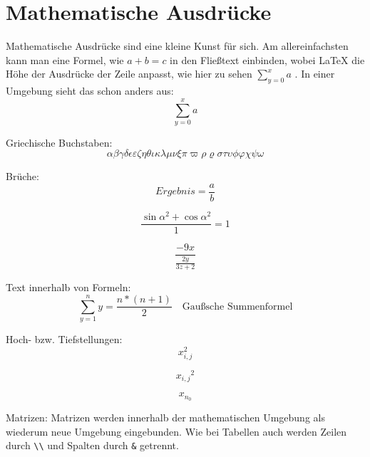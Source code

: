\section{Mathematische Ausdrücke}
Mathematische Ausdrücke sind eine kleine Kunst für sich. Am allereinfachsten kann man eine Formel, wie \(a + b = c\) in den Fließtext einbinden, wobei LaTeX die Höhe der Ausdrücke der Zeile anpasst,
wie hier zu sehen \(\sum_{y=0}^{x} a\) . In einer Umgebung sieht das schon anders aus:
\begin{equation}
  \sum_{y=0}^{x} a
\end{equation}

Griechische Buchstaben:
\begin{equation}
	\alpha\beta\gamma\delta\epsilon\varepsilon\zeta\eta
	\theta\iota\kappa\lambda\mu\nu\xi\pi\varpi\rho\varrho
	\sigma\tau\upsilon\phi\varphi\chi\psi\omega
\end{equation}

Brüche:
\begin{equation}
	Ergebnis = \frac{a}{b}
\end{equation}

\begin{equation}
	\frac{\sin{\alpha}^2 + \cos{\alpha}^2}{1} = 1
\end{equation}

\begin{equation}
	\frac{-9x}{\frac{2y}{3z+2}}
\end{equation}

Text innerhalb von Formeln:
\begin{equation}
\sum_{y=1}^{n} y = \frac{n*(n+1)}{2}
\quad
\text{Gaußsche Summenformel}
\end{equation}

Hoch- bzw. Tiefstellungen:
\begin{equation}
	x_{i,j}^2
\end{equation}

\begin{equation}
	{x_{i,j}}^2
\end{equation}

\begin{equation}
	x_{n_0}
\end{equation}


Matrizen:
Matrizen werden innerhalb der mathematischen Umgebung als wiederum neue Umgebung eingebunden. Wie bei Tabellen auch werden Zeilen durch \lstinline{\\} und Spalten durch \lstinline{&} getrennt.

